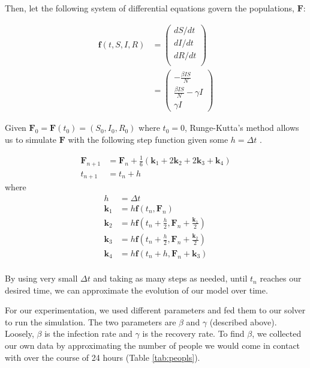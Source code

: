 \documentclass[12pt]{article}
\newcommand{\Fv}{\mathbf{F}}
\newcommand{\fv}{\mathbf{f}}
\newcommand{\kv}{\mathbf{k}}
\begin{document}
Then, let the following system of differential equations govern the populations, $\Fv$:

\begin{align*}
    \fv(t, S, I, R) &= 
    \left(
    \begin{matrix}
        dS/dt \\
        dI/dt \\
        dR/dt \\
    \end{matrix}
    \right) \\
    &= 
    \begin{pmatrix}
        -\frac{\beta I S}{N} \\
        \frac{\beta I S}{N} - \gamma I \\
        \gamma I
    \end{pmatrix}
\end{align*}

Given $\Fv_0 = \Fv(t_0) = (S_0, I_0, R_0)$ where $t_0=0$, Runge-Kutta's method allows us to simulate $\Fv$ with the following step function given some $h = \Delta t$ \cite{endre2003introduction}.

\begin{align}
    \Fv_{n+1} &= \Fv_n + \frac{1}{6}\left(\kv_1 + 2\kv_2 + 2\kv_3+\kv_4\right) \\
    t_{n+1} &= t_n+h
\end{align}
where
\begin{align}
    h &= \Delta t \\
    \kv_1 &= h \fv(t_n, \Fv_n) \\
    \kv_2 &= h \fv(t_n+\frac{h}{2}, \Fv_n + \frac{\kv_1}{2}) \\
    \kv_3 &= h \fv(t_n+\frac{h}{2}, \Fv_n + \frac{\kv_2}{2}) \\
    \kv_4 &= h \fv(t_n+h, \Fv_n+\kv_3) \\
\end{align}

By using very small $\Delta t$ and taking as many steps as needed, until $t_n$ reaches our desired time, we can approximate the evolution of our model over time.

For our experimentation, we used different parameters and fed them to our solver to run the simulation. The two parameters are $\beta$ and $\gamma$ (described above). Loosely, $\beta$ is the infection rate and $\gamma$ is the recovery rate. To find $\beta$, we collected our own data by approximating the number of people we would come in contact with over the course of 24 hours (Table \ref{tab:peopls}).
\end{document}
